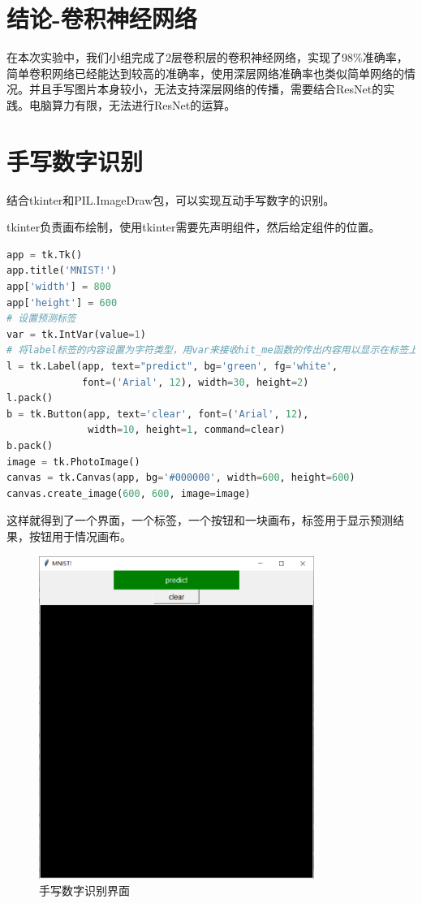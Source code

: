 \documentclass[withoutpreface,bwprint]{cumcmthesis} %
\begin{document}
\section{结论-卷积神经网络}
在本次实验中，我们小组完成了2层卷积层的卷积神经网络，实现了98\%准确率，简单卷积网络已经能达到较高的准确率，使用深层网络准确率也类似简单网络的情况。并且手写图片本身较小，无法支持深层网络的传播，需要结合ResNet的实践。电脑算力有限，无法进行ResNet的运算。
\section{手写数字识别}
结合tkinter和PIL.ImageDraw包，可以实现互动手写数字的识别。\par
tkinter负责画布绘制，使用tkinter需要先声明组件，然后给定组件的位置。
\begin{lstlisting}[language=python]
app = tk.Tk()
app.title('MNIST!')
app['width'] = 800
app['height'] = 600
# 设置预测标签
var = tk.IntVar(value=1)    
# 将label标签的内容设置为字符类型，用var来接收hit_me函数的传出内容用以显示在标签上
l = tk.Label(app, text="predict", bg='green', fg='white',
             font=('Arial', 12), width=30, height=2)
l.pack()
b = tk.Button(app, text='clear', font=('Arial', 12),
              width=10, height=1, command=clear)
b.pack()
image = tk.PhotoImage()
canvas = tk.Canvas(app, bg='#000000', width=600, height=600)
canvas.create_image(600, 600, image=image)
\end{lstlisting}
这样就得到了一个界面，一个标签，一个按钮和一块画布，标签用于显示预测结果，按钮用于情况画布。
\begin{figure}[H]
		\centering
		\includegraphics[width=0.8\textwidth]{draw}
		\caption{手写数字识别界面}
	\end{figure}
\end{document}
